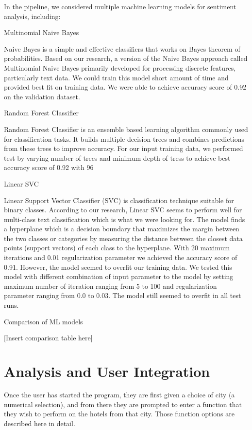 \documentclass[conference]{IEEEtran}
\begin{document}
	In the pipeline, we considered multiple machine learning models for sentiment analysis, including:
	
	Multinomial Naive Bayes 
	
	Naive Bayes is a simple and effective classifiers that works on Bayes theorem of probabilities. Based on our research, a version of the Naive Bayes approach called Multinomial Naive Bayes primarily developed for processing discrete features, particularly text data. We could train this model short amount of time and provided best fit on training data. We were able to achieve accuracy score of 0.92 on the validation dataset.
	
	Random Forest Classifier
	
	Random Forest Classifier is an ensemble based learning algorithm commonly used for classification tasks. It builds multiple decision trees and combines predictions from these trees to improve accuracy. For our input training data, we performed test by varying number of trees and minimum depth of tress to achieve best accuracy score of 0.92 with 96%
	
	Linear SVC
	
	Linear Support Vector Classifier (SVC) is classification technique suitable for binary classes. According to our research, Linear SVC seems to perform well for multi-class text classification which is what we were looking for. The model finds a hyperplane which is a decision boundary that maximizes the margin between the two classes or categories by measuring the distance between the closest data points (support vectors) of each class to the hyperplane. With 20 maximum iterations and 0.01 regularization parameter we achieved the accuracy score of 0.91. However, the model seemed to overfit our training data. We tested this model with different combination of input parameter to the model by setting maximum number of iteration ranging from 5 to 100 and regularization parameter ranging from 0.0 to 0.03. The model still seemed to overfit in all test runs.
	
	Comparison of ML models
	
	[Insert comparison table here]
	
	\section{Analysis and User Integration}
	Once the user has started the program, they are first given a choice of city (a numerical selection), and from there they are prompted to enter a function that they wish to perform on the hotels from that city. Those function options are described here in detail. 
	
\end{document}
